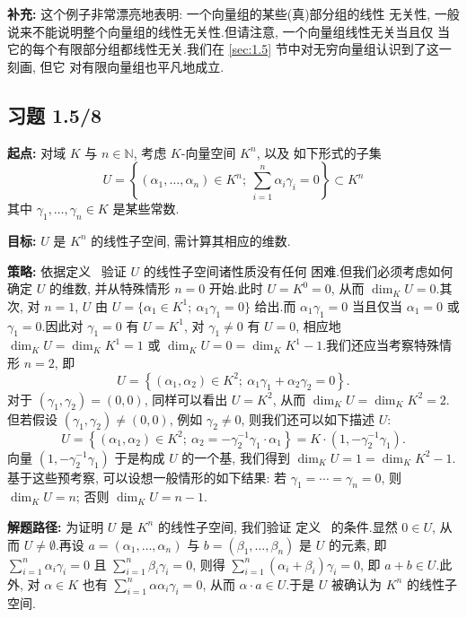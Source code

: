 \noindent\textbf{补充:} 这个例子非常漂亮地表明: 一个向量组的某些(真)部分组的线性
无关性, 一般说来不能说明整个向量组的线性无关性.但请注意, 一个向量组线性无关当且仅
当它的每个有限部分组都线性无关.我们在 \ref{sec:1.5} 节中对无穷向量组认识到了这一刻画, 但它
对有限向量组也平凡地成立.

\subsection*{习题 1.5/8}

\noindent\textbf{起点:} 对域 $K$ 与 $n \in \mathbb{N}$, 考虑 $K$-向量空间 $K^n$, 以及
如下形式的子集
\[
U = \left\{ (\alpha_1, \ldots, \alpha_n) \in K^n ;\ \sum_{i=1}^{n} \alpha_i \gamma_i = 0 \right\} \subset K^n
\]
其中 $\gamma_1, \ldots, \gamma_n \in K$ 是某些常数.

\noindent\textbf{目标:} $U$ 是 $K^n$ 的线性子空间, 需计算其相应的维数.

\noindent\textbf{策略:} 依据定义~ 验证 $U$ 的线性子空间诸性质没有任何
困难.但我们必须考虑如何确定 $U$ 的维数, 并从特殊情形 $n = 0$ 开始.此时
$U = K^0 = 0$, 从而 $\dim_K U = 0$.其次, 对 $n = 1$, $U$ 由
$U = \{ \alpha_1 \in K^1 ;\ \alpha_1 \gamma_1 = 0 \}$ 给出.而 $\alpha_1 \gamma_1 = 0$
当且仅当 $\alpha_1 = 0$ 或 $\gamma_1 = 0$.因此对 $\gamma_1 = 0$ 有 $U = K^1$, 对
$\gamma_1 \neq 0$ 有 $U = 0$, 相应地 $\dim_K U = \dim_K K^1 = 1$ 或
$\dim_K U = 0 = \dim_K K^1 - 1$.我们还应当考察特殊情形 $n = 2$, 即
\[
U = \left\{ (\alpha_1, \alpha_2) \in K^2 ;\ \alpha_1 \gamma_1 + \alpha_2 \gamma_2 = 0 \right\}\text{.}
\]
对于 $(\gamma_1, \gamma_2) = (0, 0)$, 同样可以看出 $U = K^2$, 从而
$\dim_K U = \dim_K K^2 = 2$.但若假设 $(\gamma_1, \gamma_2) \neq (0, 0)$, 例如
$\gamma_2 \neq 0$, 则我们还可以如下描述 $U$:
\[
U = \left\{ (\alpha_1, \alpha_2) \in K^2 ;\ \alpha_2 = -\gamma_2^{-1} \gamma_1 \cdot \alpha_1 \right\} = K \cdot (1, -\gamma_2^{-1} \gamma_1)\text{.}
\]
向量 $(1, -\gamma_2^{-1} \gamma_1)$ 于是构成 $U$ 的一个基, 我们得到
$\dim_K U = 1 = \dim_K K^2 - 1$.基于这些预考察, 可以设想一般情形的如下结果: 若
$\gamma_1 = \cdots = \gamma_n = 0$, 则 $\dim_K U = n$; 否则 $\dim_K U = n - 1$.

\noindent\textbf{解题路径:} 为证明 $U$ 是 $K^n$ 的线性子空间, 我们验证
定义~ 的条件.显然 $0 \in U$, 从而 $U \neq \emptyset$.再设
$a = (\alpha_1, \ldots, \alpha_n)$ 与 $b = (\beta_1, \ldots, \beta_n)$ 是 $U$ 的元素,
即 $\sum_{i=1}^{n} \alpha_i \gamma_i = 0$ 且 $\sum_{i=1}^{n} \beta_i \gamma_i = 0$, 则得
$\sum_{i=1}^{n} (\alpha_i + \beta_i) \gamma_i = 0$, 即 $a + b \in U$.此外, 对
$\alpha \in K$ 也有 $\sum_{i=1}^{n} \alpha \alpha_i \gamma_i = 0$, 从而
$\alpha \cdot a \in U$.于是 $U$ 被确认为 $K^n$ 的线性子空间.

